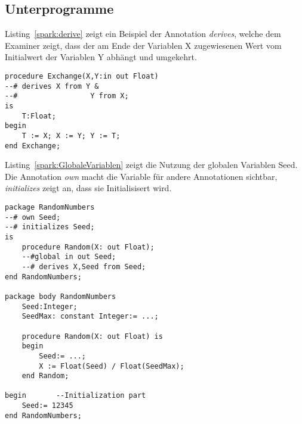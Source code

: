 \subsection{Unterprogramme}
\label{subsec:Unterprogramme}

Listing~\ref{spark:derive} zeigt ein Beispiel der Annotation \textit{derives}, welche dem Examiner zeigt, dass der am Ende der Variablen X zugewiesenen Wert vom Initialwert der Variablen Y abhängt und umgekehrt.
\begin{lstlisting}[caption={derive Beispiel}, label=spark:derive]
procedure Exchange(X,Y:in out Float)
--# derives X from Y &
--# 				Y from X;
is
	T:Float;
begin
	T := X; X := Y; Y := T;
end Exchange;
\end{lstlisting}

Listing~\ref{spark:GlobaleVariablen} zeigt die Nutzung der globalen Variablen Seed. Die Annotation \textit{own} macht die Variable für andere Annotationen sichtbar, \textit{initializes} zeigt an, dass sie Initialisisert wird.


\begin{lstlisting}[caption={Globale Variablen}, label=spark:GlobaleVariablen]
package RandomNumbers
--# own Seed;
--# initializes Seed;
is
	procedure Random(X: out Float);
	--#global in out Seed;
	--# derives X,Seed from Seed;
end RandomNumbers;

package body RandomNumbers
	Seed:Integer;
	SeedMax: constant Integer:= ...;
	
	procedure Random(X: out Float) is
	begin
		Seed:= ...;
		X := Float(Seed) / Float(SeedMax);
	end Random;
	
begin		--Initialization part
	Seed:= 12345
end RandomNumbers;
\end{lstlisting}